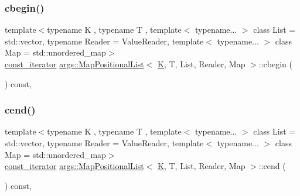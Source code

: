 \mbox{\label{classargs_1_1_map_positional_list_a5d4eda96b1f2ae63fd36b6f3a3ab80a7}} 
\subsubsection{\texorpdfstring{cbegin()}{cbegin()}}
{\footnotesize\ttfamily template$<$typename K , typename T , template$<$ typename... $>$ class List = std\+::vector, typename Reader  = Value\+Reader, template$<$ typename... $>$ class Map = std\+::unordered\+\_\+map$>$ \\
\hyperlink{classargs_1_1_map_positional_list_a0700556b0a067e095ee22edbb18206fc}{const\+\_\+iterator} \hyperlink{classargs_1_1_map_positional_list}{args\+::\+Map\+Positional\+List}$<$ \hyperlink{cgal__test_8cpp_a891e241aa245ae63618f03737efba309}{K}, T, List, Reader, Map $>$\+::cbegin (\begin{DoxyParamCaption}{ }\end{DoxyParamCaption}) const\hspace{0.3cm}{\ttfamily [inline]}, {\ttfamily [noexcept]}}

\mbox{\label{classargs_1_1_map_positional_list_a2e84a5f143ad24ad1967c3f7b788dff0}} 
\subsubsection{\texorpdfstring{cend()}{cend()}}
{\footnotesize\ttfamily template$<$typename K , typename T , template$<$ typename... $>$ class List = std\+::vector, typename Reader  = Value\+Reader, template$<$ typename... $>$ class Map = std\+::unordered\+\_\+map$>$ \\
\hyperlink{classargs_1_1_map_positional_list_a0700556b0a067e095ee22edbb18206fc}{const\+\_\+iterator} \hyperlink{classargs_1_1_map_positional_list}{args\+::\+Map\+Positional\+List}$<$ \hyperlink{cgal__test_8cpp_a891e241aa245ae63618f03737efba309}{K}, T, List, Reader, Map $>$\+::cend (\begin{DoxyParamCaption}{ }\end{DoxyParamCaption}) const\hspace{0.3cm}{\ttfamily [inline]}, {\ttfamily [noexcept]}}

